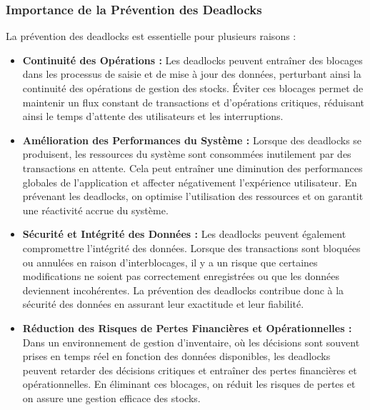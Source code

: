 \documentclass[a4paper, oneside, 12pt, final]{extreport}
\begin{document}
\subsubsection{Importance de la Prévention des Deadlocks}
La prévention des deadlocks est essentielle pour plusieurs raisons :
\begin{itemize}


\item \textbf{Continuité des Opérations :} Les deadlocks peuvent entraîner des blocages dans les processus de saisie et de mise à jour des données, perturbant ainsi la continuité des opérations de gestion des stocks. Éviter ces blocages permet de maintenir un flux constant de transactions et d'opérations critiques, réduisant ainsi le temps d'attente des utilisateurs et les interruptions.

\item \textbf{Amélioration des Performances du Système :} Lorsque des deadlocks se produisent, les ressources du système sont consommées inutilement par des transactions en attente. Cela peut entraîner une diminution des performances globales de l'application et affecter négativement l'expérience utilisateur. En prévenant les deadlocks, on optimise l'utilisation des ressources et on garantit une réactivité accrue du système.

\item \textbf{Sécurité et Intégrité des Données :} Les deadlocks peuvent également compromettre l'intégrité des données. Lorsque des transactions sont bloquées ou annulées en raison d'interblocages, il y a un risque que certaines modifications ne soient pas correctement enregistrées ou que les données deviennent incohérentes. La prévention des deadlocks contribue donc à la sécurité des données en assurant leur exactitude et leur fiabilité.

\item \textbf{Réduction des Risques de Pertes Financières et Opérationnelles :} Dans un environnement de gestion d'inventaire, où les décisions sont souvent prises en temps réel en fonction des données disponibles, les deadlocks peuvent retarder des décisions critiques et entraîner des pertes financières et opérationnelles. En éliminant ces blocages, on réduit les risques de pertes et on assure une gestion efficace des stocks.
\end{itemize}
\end{document}

